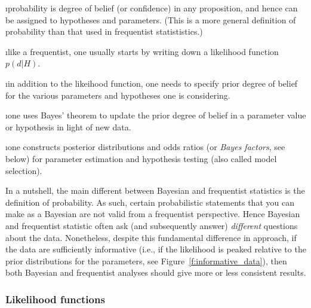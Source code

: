 \ei


\bi

\i probability is degree of belief (or confidence)
in any proposition, and hence can be assigned to 
hypotheses and parameters.
(This is a more general definition of probability than 
that used in frequentist statististics.)

\i like a frequentist, one usually starts by writing 
down a likelihood function $p(d|H)$.

\i in addition to the likeihood function, one needs to
specify prior degree of belief for the various parameters 
and hypotheses one is considering.

\i one uses Bayes' theorem to update the prior degree 
of belief in a parameter value or hypothesis in light 
of new data.

\i one constructs posterior distributions and odds 
ratios (or {\em Bayes factors}, see below) for 
parameter estimation and hypothesis testing (also 
called model selection).

\ei
\noindent
In a nutshell, the main different between Bayesian and 
frequentist statistics is the definition of probability.
As such, certain probabilistic statements that you can
make as a Bayesian are not valid from a frequentist perspective.
Hence Bayesian and frequentist statistic often ask 
(and subsequently answer) {\em different} questions 
about the data.
Nonetheless, despite this fundamental difference in approach,
if the data are sufficiently informative (i.e., if the 
likelihood is peaked relative to the prior distributions 
for the parameters, see Figure~\ref{f:informative_data}), 
then both Bayesian and frequentist analyses should give 
more or less consistent results.

\subsubsection{Likelihood functions}
\label{s:likelihood}

